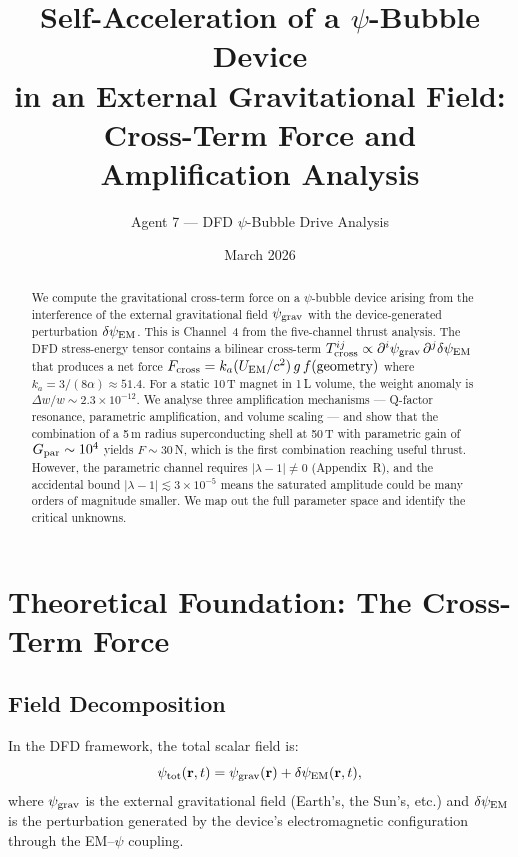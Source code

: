\documentclass[11pt]{article}
\title{Self-Acceleration of a $\psi$-Bubble Device\\
in an External Gravitational Field:\\
Cross-Term Force and Amplification Analysis}
\author{Agent 7 --- DFD $\psi$-Bubble Drive Analysis}
\date{March 2026}
\newcommand{\ka}{k_a}
\begin{document}
\maketitle

\begin{abstract}
We compute the gravitational cross-term force on a $\psi$-bubble device
arising from the interference of the external gravitational field
$\psi_{\rm grav}$ with the device-generated perturbation $\delta\psi_{\rm EM}$.
This is Channel~4 from the five-channel thrust analysis. The DFD
stress-energy tensor contains a bilinear cross-term
$T^{ij}_{\rm cross} \propto \partial^i\psi_{\rm grav}\,\partial^j\delta\psi_{\rm EM}$
that produces a net force $F_{\rm cross} = \ka (U_{\rm EM}/c^2)\,g\,f(\text{geometry})$
where $\ka = 3/(8\alpha) \approx 51.4$.
For a static 10\,T magnet in 1\,L volume, the weight anomaly is
$\Delta w/w \sim 2.3 \times 10^{-12}$.
We analyse three amplification mechanisms --- Q-factor resonance, parametric
amplification, and volume scaling --- and show that the combination of
a 5\,m radius superconducting shell at 50\,T with parametric gain of
$G_{\rm par} \sim 10^4$ yields $F \sim 30$\,N, which is the first
combination reaching useful thrust. However, the parametric channel
requires $|\lambda - 1| \neq 0$ (Appendix~R), and the accidental bound
$|\lambda - 1| \lesssim 3 \times 10^{-5}$ means the saturated amplitude
could be many orders of magnitude smaller. We map out the full parameter
space and identify the critical unknowns.
\end{abstract}

\tableofcontents

\section{Theoretical Foundation: The Cross-Term Force}\label{sec:foundation}

\subsection{Field Decomposition}

In the DFD framework, the total scalar field is:
\begin{equation}\label{eq:decomposition}
\psi_{\rm tot}(\mathbf{r},t) = \psi_{\rm grav}(\mathbf{r})
  + \delta\psi_{\rm EM}(\mathbf{r},t),
\end{equation}
where $\psi_{\rm grav}$ is the external gravitational field (Earth's, the Sun's,
etc.) and $\delta\psi_{\rm EM}$ is the perturbation generated by the device's
electromagnetic configuration through the EM--$\psi$ coupling.
\end{document}
